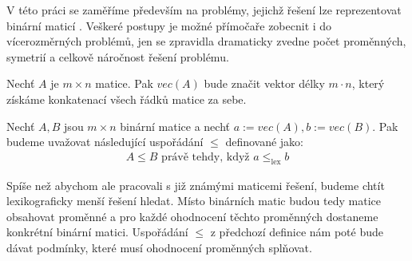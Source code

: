V této práci se zaměříme především na problémy, jejichž řešení lze reprezentovat binární maticí \cite{inproceedings}. Veškeré postupy je možné přímočaře zobecnit i do vícerozměrných problémů, jen se zpravidla dramaticky zvedne počet proměnných, symetrií a celkově náročnost řešení problému. 




\begin{definice}
Nechť $A$ je $m \times n$ matice. Pak $vec(A)$ bude značit vektor délky $m \cdot n$, který získáme konkatenací všech řádků matice za sebe.
\end{definice}

\begin{definice}
Nechť $A, B$ jsou $m \times n$ binární matice a nechť $a := vec(A), b := vec(B)$. Pak budeme uvažovat následující uspořádání $\leq$ definované jako:
\begin{align*}
A \leq B \text{ právě tehdy, když } a \leq_{\text{lex}} b
\end{align*}
\end{definice}

Spíše než abychom ale pracovali s již známými maticemi řešení, budeme chtít lexikograficky menší řešení hledat. Místo binárních matic budou tedy matice obsahovat proměnné a pro každé ohodnocení těchto proměnných dostaneme konkrétní binární matici. Uspořádání $\leq$ z předchozí definice nám poté bude dávat podmínky, které musí ohodnocení proměnných splňovat. 

